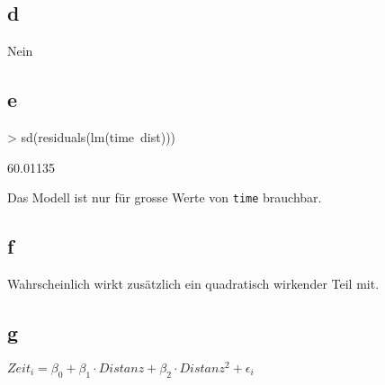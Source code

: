 \subsection{d}
Nein

\subsection{e}
\begin{Schunk}
\begin{Sinput}
> sd(residuals(lm(time~dist)))
\end{Sinput}
\begin{Soutput}
[1] 60.01135
\end{Soutput}
\end{Schunk}
Das Modell ist nur für grosse Werte von \verb?time? brauchbar. 

\subsection{f}
Wahrscheinlich wirkt zusätzlich ein quadratisch wirkender Teil mit. 

\subsection{g}
$Zeit_i 
= \beta_0 + \beta_1 \cdot Distanz + \beta_2 \cdot Distanz^2 + \epsilon_i$
